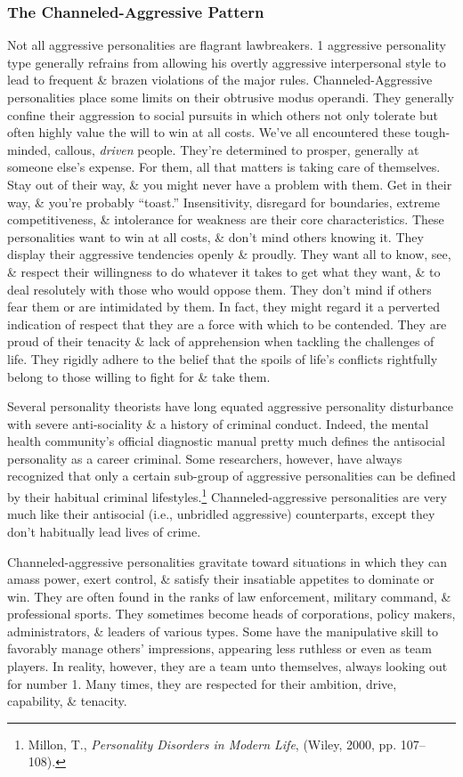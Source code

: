 \documentclass{article}
\numberwithin{equation}{section}
\begin{document}
\subsubsection{The Channeled-Aggressive Pattern}
Not all aggressive personalities are flagrant lawbreakers. 1 aggressive personality type generally refrains from allowing his overtly aggressive interpersonal style to lead to frequent \& brazen violations of the major rules. Channeled-Aggressive personalities place some limits on their obtrusive modus operandi. They generally confine their aggression to social pursuits in which others not only tolerate but often highly value the will to win at all costs. We've all encountered these tough-minded, callous, \textit{driven} people. They're determined to prosper, generally at someone else's expense. For them, all that matters is taking care of themselves. Stay out of their way, \& you might never have a problem with them. Get in their way, \& you're probably ``toast.'' Insensitivity, disregard for boundaries, extreme competitiveness, \& intolerance for weakness are their core characteristics. These personalities want to win at all costs, \& don't mind others knowing it. They display their aggressive tendencies openly \& proudly. They want all to know, see, \& respect their willingness to do whatever it takes to get what they want, \& to deal resolutely with those who would oppose them. They don't mind if others fear them or are intimidated by them. In fact, they might regard it a perverted indication of respect that they are a force with which to be contended. They are proud of their tenacity \& lack of apprehension when tackling the challenges of life. They rigidly adhere to the belief that the spoils of life's conflicts rightfully belong to those willing to fight for \& take them.

Several personality theorists have long equated aggressive personality disturbance with severe anti-sociality \& a history of criminal conduct. Indeed, the mental health community's official diagnostic manual pretty much defines the antisocial personality as a career criminal. Some researchers, however, have always recognized that only a certain sub-group of aggressive personalities can be defined by their habitual criminal lifestyles.\footnote{Millon, T., \textit{Personality Disorders in Modern Life}, (Wiley, 2000, pp. 107--108).} Channeled-aggressive personalities are very much like their antisocial (i.e., unbridled aggressive) counterparts, except they don't habitually lead lives of crime.

Channeled-aggressive personalities gravitate toward situations in which they can amass power, exert control, \& satisfy their insatiable appetites to dominate or win. They are often found in the ranks of law enforcement, military command, \& professional sports. They sometimes become heads of corporations, policy makers, administrators, \& leaders of various types. Some have the manipulative skill to favorably manage others' impressions, appearing less ruthless or even as team players. In reality, however, they are a team unto themselves, always looking out for number 1. Many times, they are respected for their ambition, drive, capability, \& tenacity.
\end{document}
